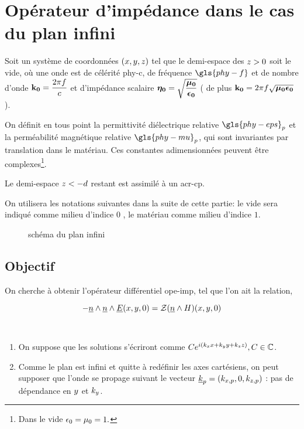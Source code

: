 \section{Opérateur d'impédance dans le cas du plan infini}\label{sec:coeffs_ref}



Soit un système de coordonnées $(\x,\y,\z)$ tel que le demi-espace des $\z>0$ soit le vide, où une onde est de célérité \gls{phy-c}, de fréquence $\gls{phy-f}$ et de nombre d'onde $\kO=\frac{2\pi f}{c}$  et d'impédance scalaire $\etaO = \sqrt{\frac{\muO}{\epsO}}$ ( de plus $\kO=2\pi f\sqrt{\muO\epsO}$ ).

On définit en tous point la permittivité diélectrique relative $\gls{phy-eps}_p$ et la perméabilité magnétique relative $\gls{phy-mu}_p$, qui sont invariantes par translation dans le matériau.
 Ces constantes adimensionnées peuvent être complexes\footnote{Dans le vide $\eps_0=\mu_0=1.$}.

Le demi-espace $\z<-d$ restant est assimilé à un \gls{acr-cp}.

On utilisera les notations  suivantes dans la suite de cette partie: le vide sera indiqué comme milieu d'indice $0$ , le matériau comme milieu d'indice $1$.

\begin{figure}[h!]
\centering
\begin{tikzpicture}

\end{tikzpicture}
\caption{schéma du plan infini}
\end{figure}\label{fig:tikz:plan}

\subsection{Objectif}
On cherche à obtenir l'opérateur différentiel \gls{ope-imp}, tel que l'on ait la relation,

\begin{equation}
\label{eq:coeff_ref:intro:ci}
-\n \pvect \n \pvect \E(\x,\y,0) = \mathcal{Z}( \n \pvect H)(\x,\y,0)
\end{equation}

\begin{hyp}{}~\\
\begin{enumerate}
    \item On suppose que les solutions s'écriront comme $Ce^{i(k_\x\x +k_\y\y+k_\z\z)}, C\in\C$.
    \item Comme le plan est infini et quitte à redéfinir les axes cartésiens, on peut supposer que l'onde se propage suivant le vecteur $\v k_p = (k_{\x,p},0,k_{\z,p})$ : pas de dépendance en $\y$ et $k_\y$.
\end{enumerate}
\end{hyp}

